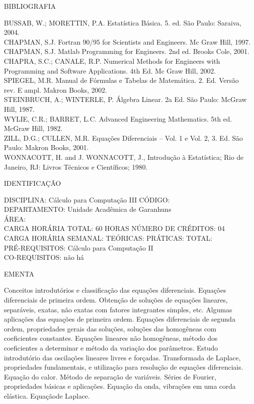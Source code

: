 \documentclass[
	12pt,				%
	openright,			%
  oneside,     %
	a4paper,			%
	chapter=TITLE,		%
	english,			%
	french,				%
	spanish,			%
	brazil				%
	]{abntex2}
\begin{document}
\begin{apendicesenv}
BIBLIOGRAFIA 

BUSSAB, W.; MORETTIN, P.A. Estatística Básica. 5. ed. São Paulo:
Saraiva, 2004.\\
CHAPMAN, S.J. Fortran 90/95 for Scientists and Engineers. Mc Graw Hill,
1997.\\
CHAPMAN, S.J. Matlab Programming for Engineers. 2nd ed. Brooks Cole,
2001.\\
CHAPRA, S.C.; CANALE, R.P. Numerical Methods for Engineers with
Programming and Software Applications. 4th Ed. Mc Graw Hill, 2002.\\
SPIEGEL, M.R. Manual de Fórmulas e Tabelas de Matemática. 2. Ed. Versão
rev. E ampl. Makron Books, 2002.\\
STEINBRUCH, A.; WINTERLE, P. Álgebra Linear. 2a Ed. São Paulo: McGraw
Hill, 1987.\\
WYLIE, C.R.; BARRET, L.C. Advanced Engineering Mathematics. 5th ed.
McGraw Hill, 1982.\\
ZILL, D.G.; CULLEN, M.R. Equações Diferenciais -- Vol. 1 e Vol. 2, 3.
Ed. São Paulo: Makron Books, 2001.\\
WONNACOTT, H. and J. WONNACOTT, J., Introdução à Estatística; Rio de
Janeiro, RJ: Livros Técnicos e Científicos; 1980.

\newpage IDENTIFICAÇÃO

DISCIPLINA: Cálculo para Computação III CÓDIGO:\\ 
DEPARTAMENTO: Unidade Acadêmica de Garanhuns\\
ÁREA: \\
CARGA HORÁRIA TOTAL: 60 HORAS NÚMERO DE CRÉDITOS: 04\\
CARGA HORÁRIA SEMANAL: TEÓRICAS: PRÁTICAS: TOTAL: \\
PRÉ-REQUISITOS: Cálculo para Computação II\\
CO-REQUISITOS: não há

EMENTA 

Conceitos introdutórios e classificação das equações diferenciais. Equações diferenciais de primeira ordem. Obtenção de soluções de equações lineares, separáveis, exatas, não exatas com fatores integrantes simples, etc. Algumas aplicações das equações de primeira ordem. Equações diferenciais de segunda ordem, propriedades gerais das soluções, soluções das homogêneas com coeficientes constantes. Equações lineares não homogêneas, método dos coeficientes a determinar e método da variação dos parâmetros. Estudo introdutório das oscilações lineares livres e forçadas. Transformada de Laplace, propriedades fundamentais, e utilização para resolução de equações diferenciais. Equação do calor. Método de separação de variáveis. Séries de Fourier, propriedades básicas e aplicações. Equação da onda, vibrações em uma corda elástica. Equaçãode Laplace.


\end{apendicesenv}
\end{document}
